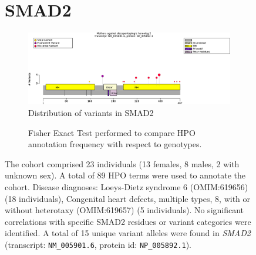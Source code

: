 \begin{figure}[htbp]
\section*{SMAD2}
\centering
\begin{subfigure}[b]{0.95\textwidth}
\centering
\includegraphics[width=\textwidth]{ img/SMAD2_protein_diagram.pdf} 
\captionsetup{justification=raggedright,singlelinecheck=false}
\caption{Distribution of variants in SMAD2}
\end{subfigure}

\vspace{2em}

\begin{subfigure}[b]{0.95\textwidth}
\centering
{}
\captionsetup{justification=raggedright,singlelinecheck=false}
\caption{Fisher Exact Test performed to compare HPO annotation frequency with respect to genotypes.}
\end{subfigure}

\vspace{2em}

\caption{ The cohort comprised 23 individuals (13 females, 8 males, 2 with unknown sex). A total of 89 HPO terms were used to annotate the cohort. Disease diagnoses: Loeys-Dietz syndrome 6 (OMIM:619656) (18 individuals), Congenital heart defects, multiple types, 8, with or without heterotaxy (OMIM:619657) (5 individuals). No significant correlations with specific SMAD2 residues or variant categories were identified. A total of 15 unique variant alleles were found in \textit{SMAD2} (transcript: \texttt{NM\_005901.6}, protein id: \texttt{NP\_005892.1}).}
\end{figure}
